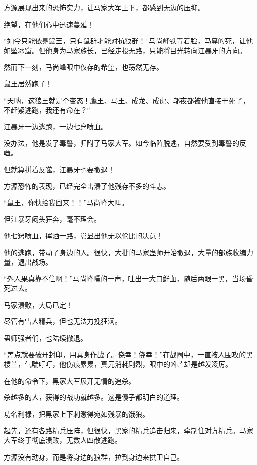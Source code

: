 
\begin{this_body}

方源展现出来的恐怖实力，让马家大军上下，都感到无边的压抑。

绝望，在他们心中迅速蔓延！

“如今只能依靠鼠王，只有鼠群才能对抗狼群！”马尚峰铁青着脸，马尊的死，让他如坠冰窟。但他身为马家族长，已经走投无路，只能将目光转向江暴牙的方向。

然而下一刻，马尚峰眼中仅存的希望，也荡然无存。

鼠王居然跑了！

“天呐，这狼王就是个变态！鹰王、马王、成龙、成虎、邬夜都被他直接干死了，不赶紧逃跑，我还有命在？”

江暴牙一边逃跑，一边七窍喷血。

没办法，他是发了毒誓，归附了马家大军。如今临阵脱逃，自然要受到毒誓的反噬。

但就算拼着反噬，江暴牙也要撤退！

方源恐怖的表现，已经完全击溃了他残存不多的斗志。

“鼠王，你快给我回来！！”马尚峰大叫。

但江暴牙闷头狂奔，毫不理会。

他七窍喷血，挥洒一路，彰显出他无以伦比的决意！

他的逃跑，带动了身边的人。很快，大批的马家蛊师开始撤退，大量的部族收编力量，退出战场。

“外人果真靠不住啊！”马尚峰噗的一声，吐出一大口鲜血，随后两眼一黑，当场昏死过去。

马家溃败，大局已定！

尽管有雪人精兵，但也无法力挽狂澜。

蛊师强者们，也陆续撤退。

“差点就要破开封印，用真身作战了。侥幸！侥幸！”在战圈中，一直被人围攻的黑楼兰，气喘吁吁，他伤痕累累，真元消耗剧烈，眼中的凶芒却是越发凌厉。

在他的命令下，黑家大军展开无情的追杀。

杀越多的人，获得的战功就越多。这是傻子都明白的道理。

功名利禄，把黑家上下刺激得宛如残暴的饿狼。

起先，还有各路精兵压阵，但很快，黑家的精兵追击归来，牵制住对方精兵。马家大军终于彻底溃败，无数人四散逃跑。

方源没有动身，而是将身边的狼群，拉到身边来拱卫自己。


\end{this_body}
